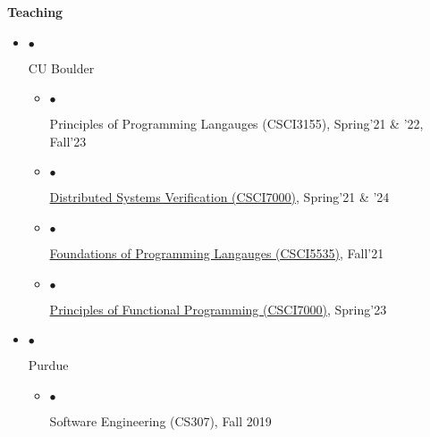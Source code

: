 \documentclass[10pt]{article}
\makeatletter
\newcommand{\lbar}[1]{{\color{#1}\ding{118}}\hspace*{2pt}}
\newcommand{\service}[1]{\item $\bullet$ \hspace{1ex}\parbox{7.2in}{#1}}
\newenvironment{talk}[4]
{ \item
  \begin{tabular*}{7.5in}{l@{\extracolsep{\fill}}r}
    \textbf{#1} & \textit{#2} \\
    \hspace{1ex} #3 & \small{#4}
\end{tabular*}
} {}
\newenvironment{itemregion}[1]{
  \vspace*{0.5ex}
  {{\textbf{\large{#1}}}}
  \begin{itemize}\itemsep1pt}
  {\end{itemize}\vspace{0.8ex}}
\makeatother
\begin{document}
\begin{itemregion}{\lbar{Mahogany}Teaching}
  \service{CU Boulder}
  \begin{itemize}
    \service{Principles of Programming Langauges (CSCI3155), Spring'21 \& '22, Fall'23}
    \service{\href{https://gowthamk.github.io/csci7000_s21/}{Distributed Systems Verification (CSCI7000)}, Spring'21 \& '24}
    \service{\href{https://csci5535.github.io/}{Foundations of
    Programming Langauges (CSCI5535)}, Fall'21}
    \service{\href{https://gowthamk.github.io/csci7000_pfp_s23/}{Principles of Functional Programming (CSCI7000)}, Spring'23}
  \end{itemize}
  \service{Purdue}
  \begin{itemize}
    \service{Software Engineering (CS307), Fall 2019}
  \end{itemize}
\end{itemregion}





\end{document}
